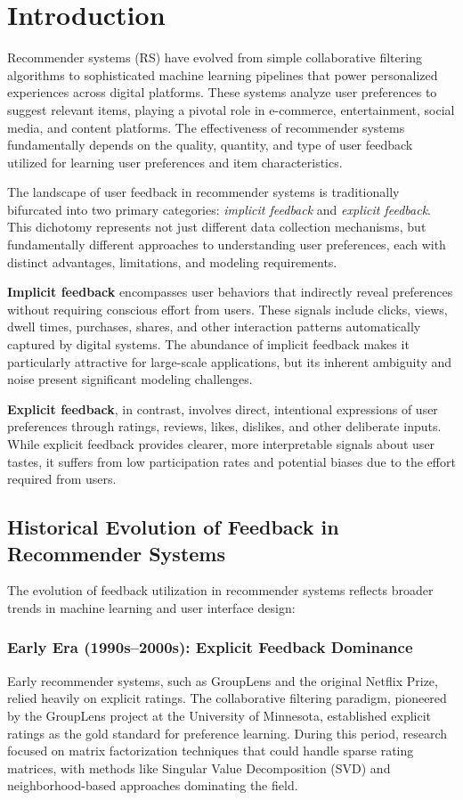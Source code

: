 \documentclass[acmsmall,review,anonymous]{acmart}
\begin{document}
\section{Introduction}
\label{sec:intro}

Recommender systems (RS) have evolved from simple collaborative filtering algorithms to sophisticated machine learning pipelines that power personalized experiences across digital platforms. These systems analyze user preferences to suggest relevant items, playing a pivotal role in e-commerce, entertainment, social media, and content platforms. The effectiveness of recommender systems fundamentally depends on the quality, quantity, and type of user feedback utilized for learning user preferences and item characteristics.

The landscape of user feedback in recommender systems is traditionally bifurcated into two primary categories: \textit{implicit feedback} and \textit{explicit feedback}. This dichotomy represents not just different data collection mechanisms, but fundamentally different approaches to understanding user preferences, each with distinct advantages, limitations, and modeling requirements.

\textbf{Implicit feedback} encompasses user behaviors that indirectly reveal preferences without requiring conscious effort from users. These signals include clicks, views, dwell times, purchases, shares, and other interaction patterns automatically captured by digital systems. The abundance of implicit feedback makes it particularly attractive for large-scale applications, but its inherent ambiguity and noise present significant modeling challenges.

\textbf{Explicit feedback}, in contrast, involves direct, intentional expressions of user preferences through ratings, reviews, likes, dislikes, and other deliberate inputs. While explicit feedback provides clearer, more interpretable signals about user tastes, it suffers from low participation rates and potential biases due to the effort required from users.

\subsection{Historical Evolution of Feedback in Recommender Systems}

The evolution of feedback utilization in recommender systems reflects broader trends in machine learning and user interface design:

\subsubsection{Early Era (1990s--2000s): Explicit Feedback Dominance}
Early recommender systems, such as GroupLens and the original Netflix Prize, relied heavily on explicit ratings. The collaborative filtering paradigm, pioneered by the GroupLens project at the University of Minnesota, established explicit ratings as the gold standard for preference learning. During this period, research focused on matrix factorization techniques that could handle sparse rating matrices, with methods like Singular Value Decomposition (SVD) and neighborhood-based approaches dominating the field.
\end{document}
